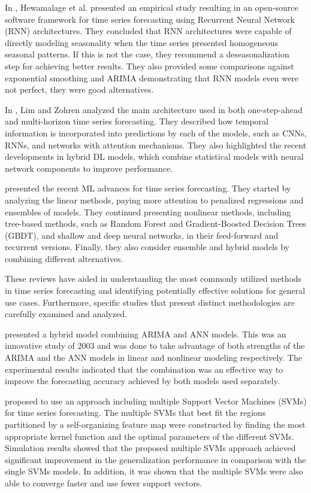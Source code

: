 In \cite{HEWAMALAGE2021388}, Hewamalage et al. presented an empirical study resulting in an open-source software framework for time series forecasting using Recurrent Neural Network (RNN) architectures.
They concluded that RNN architectures were capable of directly modeling seasonality when the time series presented homogeneous seasonal patterns.
If this is not the case, they recommend a deseasonalization step for achieving better results.
They also provided some comparisons against exponential smoothing and ARIMA demonstrating that RNN models even were not perfect, they were good alternatives.

In \cite{Lim2021}, Lim and Zohren analyzed the main architecture used in both one-step-ahead and multi-horizon time series forecasting.
They described how temporal information is incorporated into predictions by each of the models, such as CNNs, RNNs, and networks with attention mechanisms.
They also highlighted the recent developments in hybrid DL models, which combine statistical models with neural network components to improve performance.

\cite{Masini2023} presented the recent ML advances for time series forecasting.
They started by analyzing the linear methods, paying more attention to penalized regressions and ensembles of models.
They continued presenting nonlinear methods, including tree-based methods, such as Random Forest and Gradient-Boosted Decision Trees (GBDT), and shallow and deep neural networks, in their feed-forward and recurrent versions.
Finally, they also consider ensemble and hybrid models by combining different alternatives.

These reviews have aided in understanding the most commonly utilized methods in time series forecasting and identifying potentially effective solutions for general use cases.
Furthermore, specific studies that present distinct methodologies are carefully examined and analyzed.

\cite{ZHANG2003159} presented a hybrid model combining ARIMA and ANN models.
This was an innovative study of 2003 and was done to take advantage of both strengths of the ARIMA and the ANN models in linear and nonlinear modeling respectively.
The experimental results indicated that the combination was an effective way to improve the forecasting accuracy achieved by both models used separately.

\cite{CAO2003321} proposed to use an approach including multiple Support Vector Machines (SVMs) for time series forecasting.
The multiple SVMs that best fit the regions partitioned by a self-organizing feature map were constructed by finding the most appropriate kernel function and the optimal parameters of the different SVMs.
Simulation results showed that the proposed multiple SVMs approach achieved significant improvement in the generalization performance in comparison with the single SVMs models.
In addition, it was shown that the multiple SVMs were also able to converge faster and use fewer support vectors.


